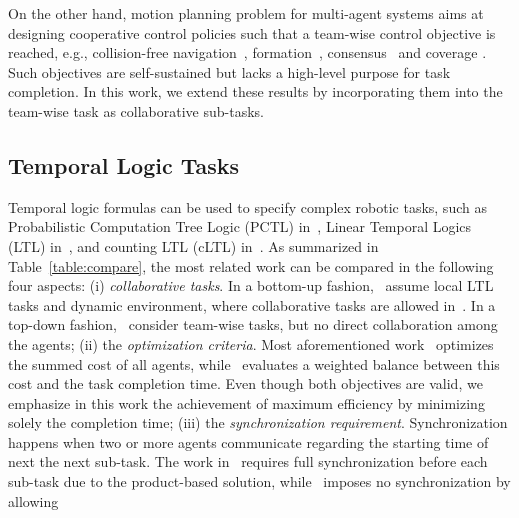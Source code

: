 On the other hand,
motion planning problem for multi-agent systems aims at designing cooperative control policies such that a team-wise control objective is reached,
e.g., collision-free navigation~\cite{lavalle2006planning}, formation~\cite{chen2005formation},
consensus~\cite{li2009consensus} and coverage \cite{mesbahi2010graph}.
Such objectives are self-sustained but lacks a high-level purpose for task completion.
In this work, we extend these results by incorporating them into the team-wise task as collaborative sub-tasks.


\subsection{Temporal Logic Tasks}\label{subsec:multi-ltl}

Temporal logic formulas can be used to specify complex robotic tasks,
such as Probabilistic Computation Tree Logic (PCTL) in~\cite{lahijanian2011temporal},
Linear Temporal Logics (LTL) in~\cite{kantaros2020stylus, schillinger2018simultaneous,
 guo2015multi, chen2011formal},
and counting LTL (cLTL) in~\cite{sahin2019multirobot}.
As summarized in Table~\ref{table:compare},
the most related work can be compared in the following four aspects:
(i) \emph{collaborative tasks}.
In a bottom-up fashion,~\cite{guo2015multi, tumova2016multi, guo2016task} assume local LTL tasks and dynamic environment,
where collaborative tasks are allowed in~\cite{guo2016task}.
In a top-down fashion,~\cite{kantaros2020stylus, schillinger2018simultaneous, luo2021temporal, sahin2019multirobot, jones2019scratchs} consider team-wise tasks,
but no direct collaboration among the agents;
(ii) the \emph{optimization criteria}.
Most aforementioned work~\cite{kantaros2020stylus, guo2016task, luo2021temporal, sahin2019multirobot, jones2019scratchs} optimizes
the summed cost of all agents,
while~\cite{schillinger2018simultaneous} evaluates a weighted balance between this cost and
the task completion time. 
Even though both objectives are valid,
we emphasize in this work the achievement of maximum efficiency by minimizing solely the completion time;
(iii) the \emph{synchronization requirement}.
Synchronization happens when two or more agents communicate regarding the starting time of next the next sub-task.
The work in~\cite{kantaros2020stylus, luo2021abstraction, sahin2019multirobot} requires
full synchronization before each sub-task due to the product-based solution,
while~\cite{schillinger2018simultaneous} imposes no synchronization by allowing
